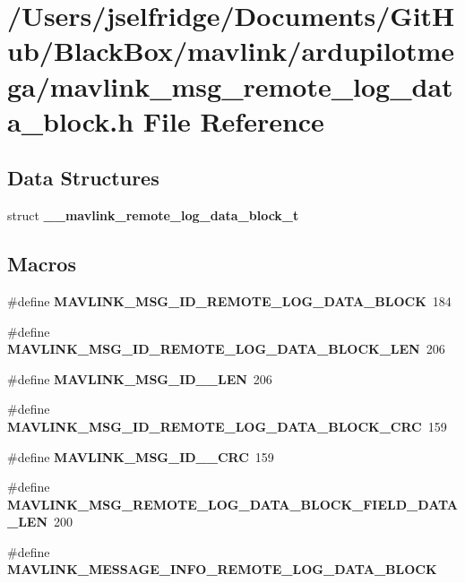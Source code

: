 \section{/\+Users/jselfridge/\+Documents/\+Git\+Hub/\+Black\+Box/mavlink/ardupilotmega/mavlink\+\_\+msg\+\_\+remote\+\_\+log\+\_\+data\+\_\+block.h File Reference}
\label{mavlink__msg__remote__log__data__block_8h}
\subsection*{Data Structures}
\begin{DoxyCompactItemize}
\item 
struct \textbf{ \+\_\+\+\_\+mavlink\+\_\+remote\+\_\+log\+\_\+data\+\_\+block\+\_\+t}
\end{DoxyCompactItemize}
\subsection*{Macros}
\begin{DoxyCompactItemize}
\item 
\#define \textbf{ M\+A\+V\+L\+I\+N\+K\+\_\+\+M\+S\+G\+\_\+\+I\+D\+\_\+\+R\+E\+M\+O\+T\+E\+\_\+\+L\+O\+G\+\_\+\+D\+A\+T\+A\+\_\+\+B\+L\+O\+CK}~184
\item 
\#define \textbf{ M\+A\+V\+L\+I\+N\+K\+\_\+\+M\+S\+G\+\_\+\+I\+D\+\_\+\+R\+E\+M\+O\+T\+E\+\_\+\+L\+O\+G\+\_\+\+D\+A\+T\+A\+\_\+\+B\+L\+O\+C\+K\+\_\+\+L\+EN}~206
\item 
\#define \textbf{ M\+A\+V\+L\+I\+N\+K\+\_\+\+M\+S\+G\+\_\+\+I\+D\+\_\+\_\+\+L\+EN}~206
\item 
\#define \textbf{ M\+A\+V\+L\+I\+N\+K\+\_\+\+M\+S\+G\+\_\+\+I\+D\+\_\+\+R\+E\+M\+O\+T\+E\+\_\+\+L\+O\+G\+\_\+\+D\+A\+T\+A\+\_\+\+B\+L\+O\+C\+K\+\_\+\+C\+RC}~159
\item 
\#define \textbf{ M\+A\+V\+L\+I\+N\+K\+\_\+\+M\+S\+G\+\_\+\+I\+D\+\_\+\_\+\+C\+RC}~159
\item 
\#define \textbf{ M\+A\+V\+L\+I\+N\+K\+\_\+\+M\+S\+G\+\_\+\+R\+E\+M\+O\+T\+E\+\_\+\+L\+O\+G\+\_\+\+D\+A\+T\+A\+\_\+\+B\+L\+O\+C\+K\+\_\+\+F\+I\+E\+L\+D\+\_\+\+D\+A\+T\+A\+\_\+\+L\+EN}~200
\item 
\#define \textbf{ M\+A\+V\+L\+I\+N\+K\+\_\+\+M\+E\+S\+S\+A\+G\+E\+\_\+\+I\+N\+F\+O\+\_\+\+R\+E\+M\+O\+T\+E\+\_\+\+L\+O\+G\+\_\+\+D\+A\+T\+A\+\_\+\+B\+L\+O\+CK}
\end{DoxyCompactItemize}
